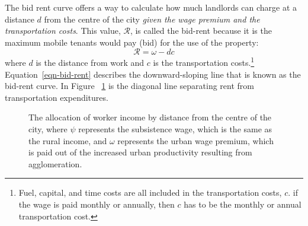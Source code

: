
The bid rent curve offers a way to calculate how much landlords can charge at a distance $d$ from the centre of the city \emph{given the wage premium and the transportation costs}. This value, $\mathcal{R}$, is called the bid-rent because it is the maximum mobile tenants would pay (bid) for the use of the property: 
\begin{equation}  
\mathcal{R}= \omega - dc \label{eqn-bid-rent}\end{equation}
where $d$ is the distance from work and $c$ is the transportation costs.\footnote{Fuel, capital, and time costs are  all included in the transportation costs, ${c}$.  if the wage is paid monthly or annually, then $c$ has to be the monthly or annual transportation cost.} Equation~\ref{eqn-bid-rent} describes the downward-sloping line  that is known as the bid-rent curve. In Figure ~\ref{fig-alonso-simple} is the diagonal line separating rent from transportation expenditures.


\begin{figure}[!ht]
    \begin{center}
    
    \caption[The allocation of worker income by distance from the centre of the city.]{The allocation of worker income by distance from the centre of the city, where $\psi$ represents the \gls{subsistence wage}, which is the same as the rural income, and $\omega$ represents the \gls{urban wage premium}, which is paid out of the increased urban productivity resulting from agglomeration.}
    \label{fig-alonso-simple}
    \end{center}
\end{figure}

 

